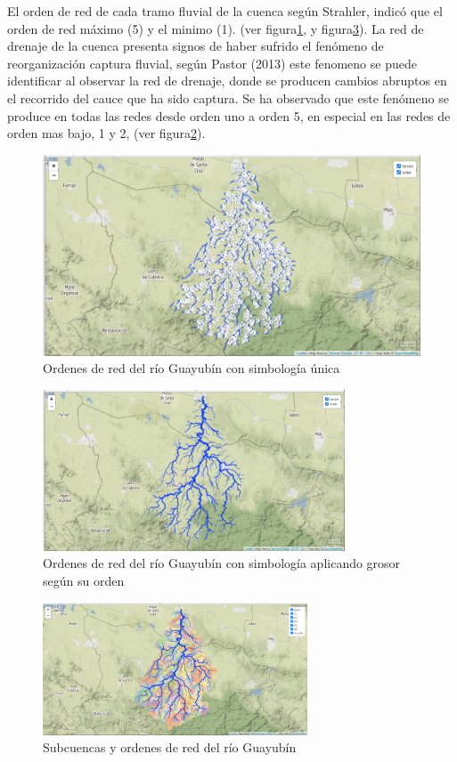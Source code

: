 \documentclass[11pt,]{article}
\begin{document}
El orden de red de cada tramo fluvial de la cuenca según Strahler,
indicó que el orden de red máximo (5) y el minimo (1). (ver
figura\ref{unica}, y figura\ref{subcuencas}). La red de drenaje de la
cuenca presenta signos de haber sufrido el fenómeno de reorganización
captura fluvial, según Pastor (2013) este fenomeno se puede identificar
al observar la red de drenaje, donde se producen cambios abruptos en el
recorrido del cauce que ha sido captura. Se ha observado que este
fenómeno se produce en todas las redes desde orden uno a orden 5, en
especial en las redes de orden mas bajo, 1 y 2, (ver
figura\ref{grosor}).

\begin{figure}
\centering
\includegraphics[width=1.00000\textwidth]{ordenes de red.png}
\caption{Ordenes de red del río Guayubín con simbología
única\label{unica}}
\end{figure}

\begin{figure}
\centering
\includegraphics[width=0.80000\textwidth]{orden de red mapa 2.png}
\caption{Ordenes de red del río Guayubín con simbología aplicando grosor
según su orden\label{grosor}}
\end{figure}

\begin{figure}
\centering
\includegraphics[width=0.70000\textwidth]{cuencas delimitadas y ordenes de red.png}
\caption{Subcuencas y ordenes de red del río Guayubín\label{subcuencas}}
\end{figure}
\end{document}
